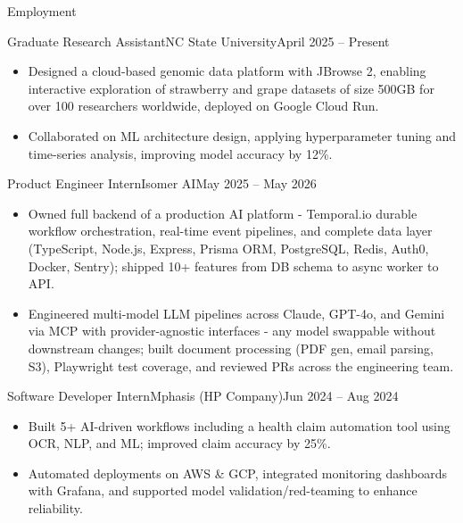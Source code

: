 \documentclass[]{mcdowellcv}
\begin{document}
\makeheader


\begin{cvsection}{Employment}
  \begin{cvsubsection}{Graduate Research Assistant}{NC State University}{April 2025 -- Present}
    \begin{itemize}
      \item Designed a cloud-based genomic data platform with JBrowse 2, enabling interactive exploration of strawberry and grape datasets of size 500GB for over 100 researchers worldwide, deployed on Google Cloud Run.      
      \item Collaborated on ML architecture design, applying hyperparameter tuning and time-series analysis, improving model accuracy by 12\%.
    \end{itemize}
    \vspace{-1.5pt}
  \end{cvsubsection}

  \begin{cvsubsection}{Product Engineer Intern}{Isomer AI}{May 2025 -- May 2026}
    \begin{itemize}
      \item Owned full backend of a production AI platform - Temporal.io durable workflow orchestration, real-time event pipelines, and complete data layer (TypeScript, Node.js, Express, Prisma ORM, PostgreSQL, Redis, Auth0, Docker, Sentry); shipped 10+ features from DB schema to async worker to API.
      \item Engineered multi-model LLM pipelines across Claude, GPT-4o, and Gemini via MCP with provider-agnostic interfaces - any model swappable without downstream changes; built document processing (PDF gen, email parsing, S3), Playwright test coverage, and reviewed PRs across the engineering team. 
    \end{itemize}
    \vspace{-1.5pt}
  \end{cvsubsection}   

  \begin{cvsubsection}{Software Developer Intern}{Mphasis (HP Company)}{Jun 2024 -- Aug 2024}
    \begin{itemize}
      \item Built 5+ AI-driven workflows including a health claim automation tool using OCR, NLP, and ML; improved claim accuracy by 25\%. 
      \item Automated deployments on AWS \& GCP, integrated monitoring dashboards with Grafana, and supported model validation/red-teaming to enhance reliability.
    \end{itemize}
    \vspace{-1.5pt}
  \end{cvsubsection}  
  

\end{cvsection}
\end{document}
